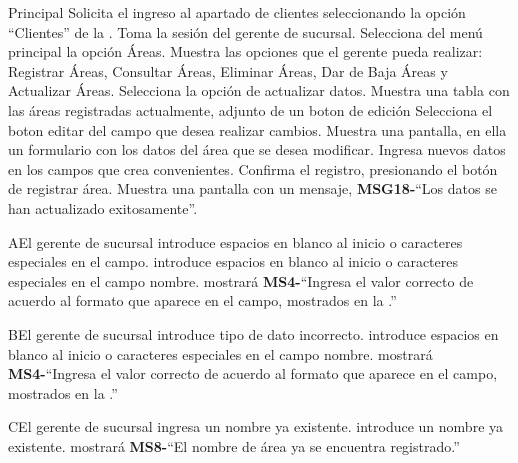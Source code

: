 	\begin{UCtrayectoria}{Principal}
		\UCpaso[\UCactor] Solicita el ingreso al apartado de clientes seleccionando la opción ``Clientes'' de la .
		\UCpaso Toma la sesión del gerente de sucursal.
		\UCpaso[\UCactor] Selecciona del menú principal la opción Áreas.
		\UCpaso Muestra las opciones que el gerente pueda realizar: Registrar Áreas, Consultar Áreas, Eliminar Áreas, Dar de Baja Áreas y Actualizar Áreas.
		\UCpaso[\UCactor] Selecciona la opción de actualizar datos.
		\UCpaso Muestra una tabla con las áreas registradas actualmente, adjunto de un boton de edición
		\UCpaso[\UCactor] Selecciona el boton editar del campo que desea realizar cambios.
		\UCpaso Muestra una pantalla, en ella un formulario con los datos del área que se desea modificar.
		\UCpaso[\UCactor] Ingresa nuevos datos en los campos que crea convenientes.  
		\UCpaso[\UCactor] Confirma el registro, presionando el botón de registrar área.
		\UCpaso Muestra una pantalla con un mensaje, {\bf MSG18-}``Los datos se han actualizado exitosamente''.
	\end{UCtrayectoria}

		\begin{UCtrayectoriaA}{A}{El gerente de sucursal introduce espacios en blanco al inicio o caracteres especiales en el campo.}
			\UCpaso[\UCactor] introduce espacios en blanco al inicio o caracteres especiales en el campo nombre.
			\UCpaso mostrará {\bf MS4-}``Ingresa el valor correcto de acuerdo al formato que aparece en el campo, mostrados en la .''
		\end{UCtrayectoriaA}

		\begin{UCtrayectoriaA}{B}{El gerente de sucursal introduce tipo de dato incorrecto.}
			\UCpaso[\UCactor] introduce espacios en blanco al inicio o caracteres especiales en el campo nombre.
			\UCpaso mostrará {\bf MS4-}``Ingresa el valor correcto de acuerdo al formato que aparece en el campo, mostrados en la .''
		\end{UCtrayectoriaA}

		\begin{UCtrayectoriaA}{C}{El gerente de sucursal ingresa un nombre ya existente.}
			\UCpaso[\UCactor] introduce un nombre ya existente.
			\UCpaso mostrará {\bf MS8-}``El nombre de área ya se encuentra registrado.''
		\end{UCtrayectoriaA}